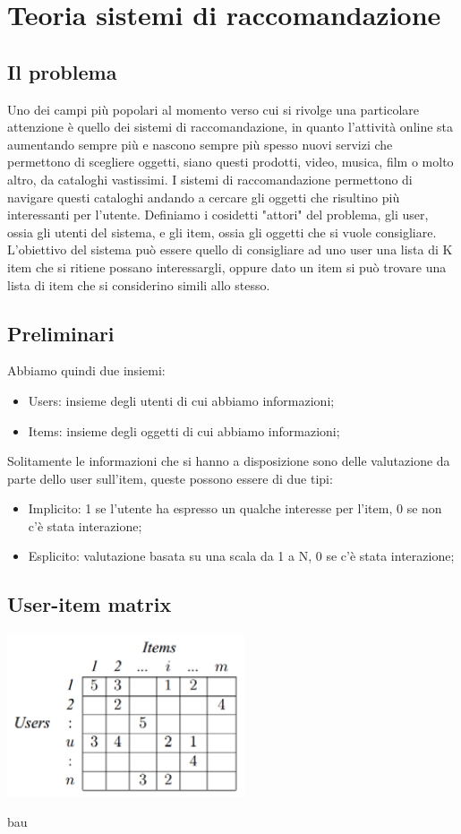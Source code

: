
\hypertarget{(chap:capitolo4)}{}
\chapter{Teoria sistemi di raccomandazione}
\section{Il problema}
Uno dei campi più popolari al momento verso cui si rivolge una particolare attenzione è quello dei sistemi di raccomandazione, in quanto l'attività online sta aumentando sempre più e nascono sempre più spesso nuovi servizi che permettono di scegliere oggetti, siano questi prodotti, video, musica, film o molto altro, da cataloghi vastissimi. I sistemi di raccomandazione permettono di navigare questi cataloghi andando a cercare gli oggetti che risultino più interessanti per l'utente. Definiamo i cosidetti "attori" del problema, gli user, ossia gli utenti del sistema, e gli item, ossia gli oggetti che si vuole consigliare. L'obiettivo del sistema può essere quello di consigliare ad uno user una lista di K item che si ritiene possano interessargli, oppure dato un item si può trovare una lista di item che si considerino simili allo stesso.
\section{Preliminari}
Abbiamo quindi due insiemi:
\begin{itemize}
	\item Users: insieme degli utenti di cui abbiamo informazioni;
	\item Items: insieme degli oggetti di cui abbiamo informazioni;
\end{itemize}
Solitamente le informazioni che si hanno a disposizione sono delle valutazione da parte dello user sull'item, queste possono essere di due tipi:
\begin{itemize}
	\item Implicito: 1 se l'utente ha espresso un qualche interesse per l'item, 0 se non c'è stata interazione;
	\item Esplicito: valutazione basata su una scala da 1 a N, 0 se c'è stata interazione;
\end{itemize}
\section{User-item matrix}
\begin{minipage}[H]{0.6\textwidth}
	\includegraphics[width=7cm]{figures/Sample-of-user-item-matrix}
\end{minipage}
\begin{minipage}[H]{0.4\textwidth}
	bau
\end{minipage}